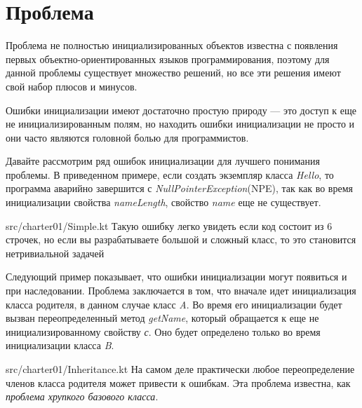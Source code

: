 \chapter{Проблема}\label{ch:проблема-}


Проблема не полностью инициализированных объектов известна с появления первых объектно-ориентированных языков программирования,
поэтому для данной проблемы существует множество решений, но все эти решения имеют свой набор плюсов и минусов.

Ошибки инициализации имеют достаточно простую природу --- это доступ к еще не инициализированным полям,
но находить ошибки инициализации не просто и они часто являются головной болью для программистов.

Давайте рассмотрим ряд ошибок инициализации для лучшего понимания проблемы.
В приведенном примере, если создать экземпляр класса \emph{Hello}, то программа аварийно завершится
с \emph{NullPointerException}(NPE),
так как во время инициализации свойства \emph{nameLength}, свойство \emph{name} еще не существует.

{src/charter01/Simple.kt}
Такую ошибку легко увидеть если код состоит из 6 строчек, но если вы разрабатываете большой и сложный класс,
то это становится нетривиальной задачей

Следующий пример показывает, что ошибки инициализации могут появиться и при наследовании.
Проблема заключается в том, что вначале идет инициализация класса родителя, в данном случае класс \emph{A}.
Во время его инициализации будет вызван переопределенный метод \emph{getName},
который обращается к еще не инициализированному свойству \emph{с}.
Оно будет определено только во время инициализации класса \emph{B}.

{src/charter01/Inheritance.kt}
На самом деле практически любое переопределение членов класса родителя может привести к ошибкам.
Эта проблема известна, как \textit{проблема хрупкого базового класса}\cite{fragile-base-class-problem}.

